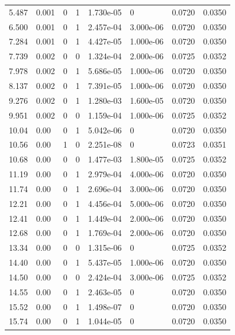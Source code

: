 \documentclass[preview]{standalone}
\begin{document}
{{\begin{tabular}{L{1.2cm}C{1.2cm} C{0.3cm}C{0.5cm} C{1.4cm}C{1.4cm} C{1.4cm}C{1.4cm}}
  5.487  &  0.001  & 0     &  1 &  1.730e-05  & 0  & 0.0720 &  0.0350   \\ 
  6.500  &  0.001  & 0     &  1 &  2.457e-04  & 3.000e-06  & 0.0720 &  0.0350   \\ 
  7.284  &  0.001  & 0     &  1 &  4.427e-05  & 1.000e-06  & 0.0720 &  0.0350   \\ 
  7.739  &  0.002  & 0     &  0 &  1.324e-04  & 2.000e-06  & 0.0725 &  0.0352   \\ 
  7.978  &  0.002  & 0     &  1 &  5.686e-05  & 1.000e-06  & 0.0720 &  0.0350   \\ 
  8.137  &  0.002  & 0     &  1 &  7.391e-05  & 1.000e-06  & 0.0720 &  0.0350   \\ 
  9.276  &  0.002  & 0     &  1 &  1.280e-03  & 1.600e-05  & 0.0720 &  0.0350   \\ 
  9.951  &  0.002  & 0     &  0 &  1.159e-04  & 1.000e-06  & 0.0725 &  0.0352   \\ 
  10.04  &  0.00  & 0     &  1 &  5.042e-06  & 0  & 0.0720 &  0.0350   \\ 
  10.56  &  0.00  & 1     &  0 &  2.251e-08  & 0  & 0.0723 &  0.0351   \\ 
  10.68  &  0.00  & 0     &  0 &  1.477e-03  & 1.800e-05  & 0.0725 &  0.0352   \\ 
  11.19  &  0.00  & 0     &  1 &  2.979e-04  & 4.000e-06  & 0.0720 &  0.0350   \\ 
  11.74  &  0.00  & 0     &  1 &  2.696e-04  & 3.000e-06  & 0.0720 &  0.0350   \\ 
  12.21  &  0.00  & 0     &  1 &  4.456e-04  & 5.000e-06  & 0.0720 &  0.0350   \\ 
  12.41  &  0.00  & 0     &  1 &  1.449e-04  & 2.000e-06  & 0.0720 &  0.0350   \\ 
  12.68  &  0.00  & 0     &  1 &  1.769e-04  & 2.000e-06  & 0.0720 &  0.0350   \\ 
  13.34  &  0.00  & 0     &  0 &  1.315e-06  & 0  & 0.0725 &  0.0352   \\ 
  14.40  &  0.00  & 0     &  1 &  5.437e-05  & 1.000e-06  & 0.0720 &  0.0350   \\ 
  14.50  &  0.00  & 0     &  0 &  2.424e-04  & 3.000e-06  & 0.0725 &  0.0352   \\ 
  14.55  &  0.00  & 0     &  1 &  2.463e-05  & 0  & 0.0720 &  0.0350   \\ 
  15.52  &  0.00  & 0     &  1 &  1.498e-07  & 0  & 0.0720 &  0.0350   \\ 
  15.74  &  0.00  & 0     &  1 &  1.044e-05  & 0  & 0.0720 &  0.0350   \\ 

\end{tabular}}}
\end{document}
